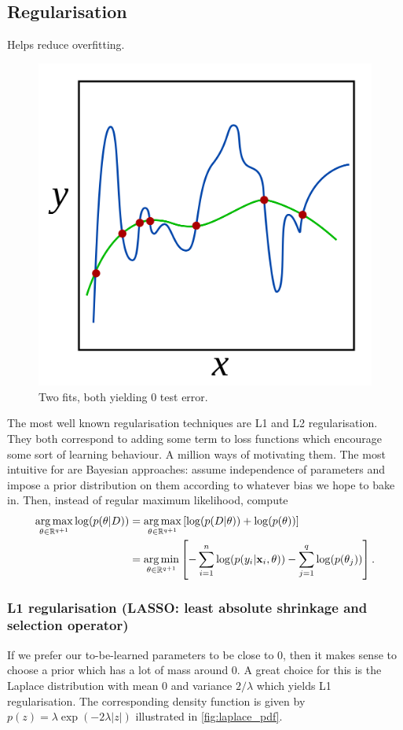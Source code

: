 \documentclass[11pt]{article}
\begin{document}
\subsection{Regularisation}
Helps reduce overfitting.

\begin{figure}[ht]
    \centering
    \includegraphics[width=0.5\columnwidth]{./figures/supervised_learning/regularisation_two_plots_zero_test_error.png}
    \caption{Two fits, both yielding 0 test error.}
    \label{fig:regularisation_two_plots}
\end{figure}

The most well known regularisation techniques are L1 and L2 regularisation. They both correspond to adding some term to loss functions which encourage some sort of learning behaviour. A million ways of motivating them. The most intuitive for are Bayesian approaches: assume independence of parameters and impose a prior distribution on them according to whatever bias we hope to bake in. Then, instead of regular maximum likelihood, compute
\begin{align*}
    \operatorname*{arg\,max}_{\theta\in\mathbb{R}^{q+1}}\log(p(\theta|D))
    &=
    \operatorname*{arg\,max}_{\theta\in\mathbb{R}^{q+1}}\left[\log(p(D|\theta))+\log(p(\theta))\right]\\
    &=
    \operatorname*{arg\,min}_{\theta\in\mathbb{R}^{q+1}}\left[-\sum_{i=1}^n\log(p(y_i|\mathbf{x}_i,\theta))-\sum_{j=1}^q\log(p(\theta_j))\right].
\end{align*}

\subsubsection{L1 regularisation (LASSO: least absolute shrinkage and selection operator)}
If we prefer our to-be-learned parameters to be close to 0, then it makes sense to choose a prior which has a lot of mass around 0. A great choice for this is the Laplace distribution with mean 0 and variance $2/\lambda$ which yields L1 regularisation. The corresponding density function is given by $p(z)=\lambda\exp(-2\lambda|z|)$ illustrated in \autoref{fig:laplace_pdf}.
\end{document}
